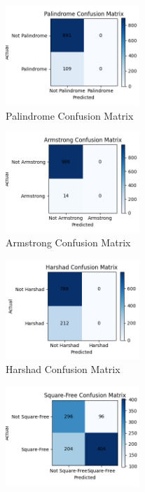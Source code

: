 \documentclass[twoside]{article}
\begin{document}
\begin{multicols}{2}
\begin{figure}[H]
    \centering
    \includegraphics[width=0.45\textwidth]{plots/palindrome_confusion.png}
    \caption{Palindrome Confusion Matrix}
\end{figure}
\begin{figure}[H]
    \centering
    \includegraphics[width=0.45\textwidth]{plots/armstrong_confusion.png}
    \caption{Armstrong Confusion Matrix}
\end{figure}
\begin{figure}[H]
    \centering
    \includegraphics[width=0.45\textwidth]{plots/harshad_confusion.png}
    \caption{Harshad Confusion Matrix}
\end{figure}
\begin{figure}[H]
    \centering
    \includegraphics[width=0.45\textwidth]{plots/square-free_confusion.png}

\end{figure}
\end{multicols}
\end{document}
